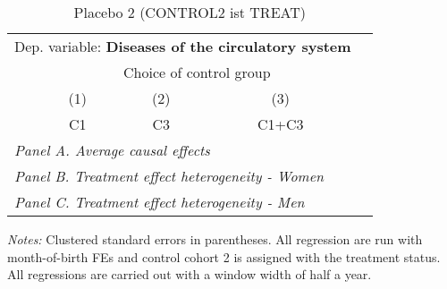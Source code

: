  \begin{table}[H] \centering \begin{threeparttable} \caption{Placebo 2 (CONTROL2 ist TREAT) } {\def\sym#1{\ifmmode^{#1}\else\(^{#1}\)\fi} \begin{tabular}{l*{4}{c}} \toprule \multicolumn{4}{l}{Dep. variable: \textbf{Diseases of the circulatory system}} \\ & \multicolumn{3}{c}{Choice of control group} \\ \cmidrule(lr){2-4}
            &\multicolumn{1}{c}{(1)}&\multicolumn{1}{c}{(2)}&\multicolumn{1}{c}{(3)}\\
            &\multicolumn{1}{c}{C1}&\multicolumn{1}{c}{C3}&\multicolumn{1}{c}{C1+C3}\\
\midrule
 \multicolumn{4}{l}{\emph{Panel A. Average causal effects}} \\      \midrule\multicolumn{4}{l}{\emph{Panel B. Treatment effect heterogeneity - Women}} \\      \midrule\multicolumn{4}{l}{\emph{Panel C. Treatment effect heterogeneity - Men}} \\      
\bottomrule \end{tabular} } \begin{tablenotes} \item \scriptsize \emph{Notes:} Clustered standard errors in parentheses. All regression are run with month-of-birth FEs and control cohort 2 is assigned with the treatment status. All regressions are carried out with a window width of half a year. \end{tablenotes} \end{threeparttable} \end{table} 
